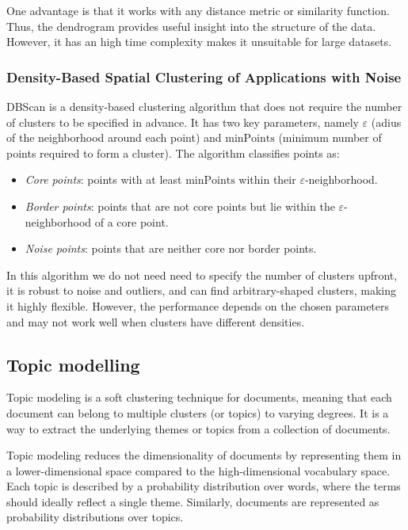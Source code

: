 One advantage is that it works with any distance metric or similarity function.
Thus, the dendrogram provides useful insight into the structure of the data.
However, it has an high time complexity makes it unsuitable for large datasets.

\subsubsection{Density-Based Spatial Clustering of Applications with Noise}
DBScan is a density-based clustering algorithm that does not require the number of clusters to be specified in advance.
It has two key parameters, namely $\varepsilon$ (adius of the neighborhood around each point) and $\text{minPoints}$ (minimum number of points required to form a cluster). 
The algorithm classifies points as: 
\begin{itemize}
    \item \textit{Core points}: points with at least $\text{minPoints}$ within their $\varepsilon$-neighborhood.
    \item \textit{Border points}: points that are not core points but lie within the $\varepsilon$-neighborhood of a core point.
    \item \textit{Noise points}: points that are neither core nor border points.
\end{itemize}
\noindent In this algorithm we do not need need to specify the number of clusters upfront, it is robust to noise and outliers, and can find arbitrary-shaped clusters, making it highly flexible.
However, the performance depends on the chosen parameters and may not work well when clusters have different densities.

\subsection{Topic modelling}
Topic modeling is a soft clustering technique for documents, meaning that each document can belong to multiple clusters (or topics) to varying degrees. 
It is a way to extract the underlying themes or topics from a collection of documents.

Topic modeling reduces the dimensionality of documents by representing them in a lower-dimensional space compared to the high-dimensional vocabulary space.
Each topic is described by a probability distribution over words, where the terms should ideally reflect a single theme. 
Similarly, documents are represented as probability distributions over topics.

